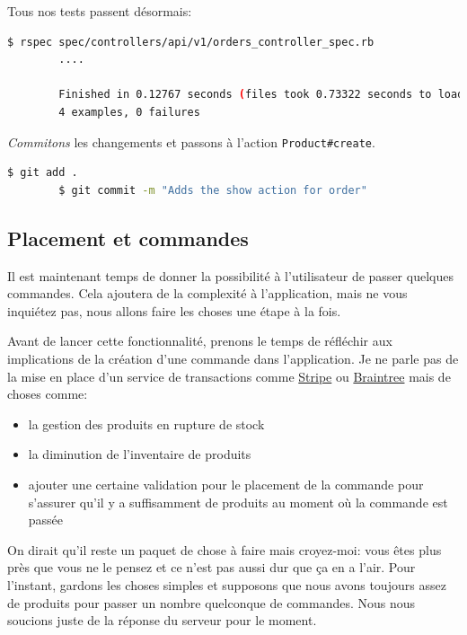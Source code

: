 \documentclass[]{report}
\begin{document}
      Tous nos tests passent désormais:

      \begin{scriptsize}
        \begin{lstlisting}[language=bash]
        $ rspec spec/controllers/api/v1/orders_controller_spec.rb
        ....

        Finished in 0.12767 seconds (files took 0.73322 seconds to load)
        4 examples, 0 failures
        \end{lstlisting}
      \end{scriptsize}


      \textit{Commitons} les changements et passons à l'action \verb|Product#create|.

      \begin{scriptsize}
        \begin{lstlisting}[language=bash]
        $ git add .
        $ git commit -m "Adds the show action for order"
        \end{lstlisting}
      \end{scriptsize}

    \subsection{Placement et commandes}

      Il est maintenant temps de donner la possibilité à l'utilisateur de passer quelques commandes. Cela ajoutera de la complexité à l'application, mais ne vous inquiétez pas, nous allons faire les choses une étape à la fois.

      Avant de lancer cette fonctionnalité, prenons le temps de réfléchir aux implications de la création d'une commande dans l'application. Je ne parle pas de la mise en place d'un service de transactions comme \href{https://stripe.com/}{Stripe} ou \href{https://www.braintreepayments.com/}{Braintree} mais de choses comme:

      \begin{itemize}
        \item la gestion des produits en rupture de stock
        \item la diminution de l'inventaire de produits
        \item ajouter une certaine validation pour le placement de la commande pour s'assurer qu'il y a suffisamment de produits au moment où la commande est passée
      \end{itemize}


      On dirait qu'il reste un paquet de chose à faire mais croyez-moi: vous êtes plus près que vous ne le pensez et ce n'est pas aussi dur que ça en a l'air. Pour l'instant, gardons les choses simples et supposons que nous avons toujours assez de produits pour passer un nombre quelconque de commandes. Nous nous soucions juste de la réponse du serveur pour le moment.
\end{document}
